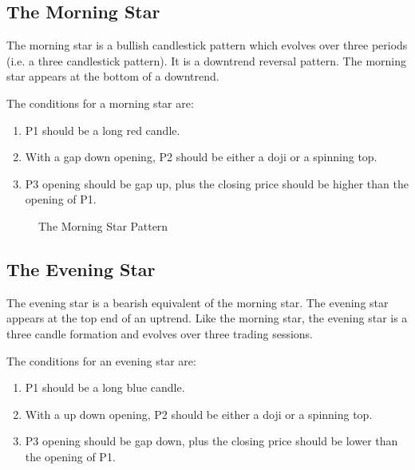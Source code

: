 \subsection{The Morning Star}

The morning star is a bullish candlestick pattern which evolves over three periods (i.e. a three candlestick pattern). It is a downtrend reversal pattern. The morning star appears at the bottom of a downtrend.

The conditions for a morning star are:
\begin{enumerate}
  \item P1 should be a long red candle.
  \item With a gap down opening, P2 should be either a doji or a spinning top.
  \item P3 opening should be gap up, plus the closing price should be higher than the opening of P1.
\end{enumerate}

\begin{figure}[h]
  \centering

  \caption{The Morning Star Pattern}
\end{figure}


\subsection{The Evening Star}

The evening star is a bearish equivalent of the morning star. The evening star appears at the top end of an uptrend. Like the morning star, the evening star is a three candle formation and evolves over three trading sessions.

The conditions for an evening star are:
\begin{enumerate}
  \item P1 should be a long blue candle.
  \item With a up down opening, P2 should be either a doji or a spinning top.
  \item P3 opening should be gap down, plus the closing price should be lower than the opening of P1.
\end{enumerate}

